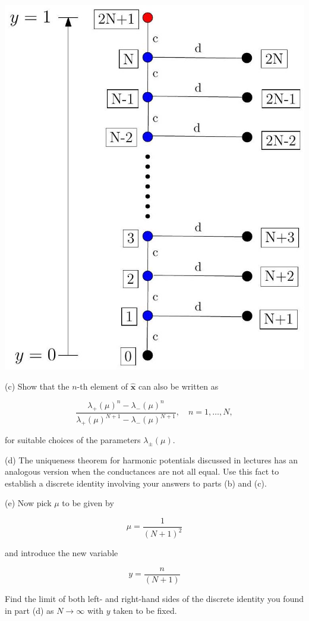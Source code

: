 \documentclass[10pt, a4paper]{article}
\begin{document}
\begin{Problem}
\begin{center}
\includegraphics[scale=0.15]{2023_03_08_5758588d6e703b32009fg-2.jpg}
\end{center}

(c) Show that the $n$-th element of $\hat{\mathbf{x}}$ can also be written as

$$
\frac{\lambda_{+}(\mu)^{n}-\lambda_{-}(\mu)^{n}}{\lambda_{+}(\mu)^{N+1}-\lambda_{-}(\mu)^{N+1}}, \quad n=1, \ldots, N,
$$

for suitable choices of the parameters $\lambda_{ \pm}(\mu)$.

(d) The uniqueness theorem for harmonic potentials discussed in lectures has an analogous version when the conductances are not all equal. Use this fact to establish a discrete identity involving your answers to parts (b) and (c).

(e) Now pick $\mu$ to be given by

$$
\mu=\frac{1}{(N+1)^{2}}
$$

and introduce the new variable

$$
y=\frac{n}{(N+1)}
$$

Find the limit of both left- and right-hand sides of the discrete identity you found in part (d) as $N \rightarrow \infty$ with $y$ taken to be fixed.
\end{Problem}
\end{document}
